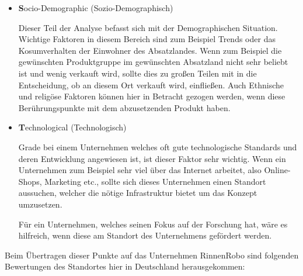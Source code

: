 \begin{itemize}
                \item \textbf Socio-Demographic (Sozio-Demographisch)
                
                    Dieser Teil der Analyse befasst sich mit der Demographischen Situation. Wichtige Faktoren in diesem 
                    Bereich sind zum Beispiel Trends oder das Kosumverhalten der Einwohner des Absatzlandes. Wenn zum 
                    Beispiel die gewünschten Produktgruppe im gewünschten Absatzland nicht sehr beliebt ist und wenig 
                    verkauft wird, sollte dies zu großen Teilen mit in die Entscheidung, ob an diesem Ort verkauft wird, 
                    einfließen. Auch Ethnische und religöse Faktoren können hier in Betracht gezogen werden, wenn diese 
                    Berührungspunkte mit dem abzusetzenden Produkt haben.
    
                \item \textbf Technological (Technologisch)
                
                    Grade bei einem Unternehmen welches oft gute technologische Standards und deren Entwicklung angewiesen 
                    ist, ist dieser Faktor sehr wichtig. Wenn ein Unternehmen zum Beispiel sehr viel über das Internet 
                    arbeitet, also Online-Shops, Marketing etc., sollte sich dieses Unternehmen einen Standort aussuchen,
                    welcher die nötige Infrastruktur bietet um das Konzept umzusetzen.
    
                    Für ein Unternehmen, welches seinen Fokus auf der Forschung hat, wäre es hilfreich, wenn diese am
                    Standort des Unternehmens gefördert werden.
            \end{itemize}
    
        Beim Übertragen dieser Punkte auf das Unternehmen RinnenRobo sind folgenden Bewertungen des Standortes hier in
        Deutschland herausgekommen:
    
